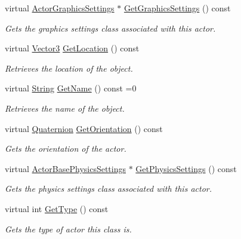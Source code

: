\begin{DoxyCompactItemize}
virtual \hyperlink{classMezzanine_1_1ActorGraphicsSettings}{ActorGraphicsSettings} $\ast$ \hyperlink{classMezzanine_1_1ActorBase_ae57a1a39b5f9483c949f6e3651aa163f}{GetGraphicsSettings} () const 
\begin{DoxyCompactList}\small\item\em Gets the graphics settings class associated with this actor. \item\end{DoxyCompactList}\item 
virtual \hyperlink{classMezzanine_1_1Vector3}{Vector3} \hyperlink{classMezzanine_1_1ActorBase_ab1706a379bf86d020e64e4b560cdeb73}{GetLocation} () const 
\begin{DoxyCompactList}\small\item\em Retrieves the location of the object. \item\end{DoxyCompactList}\item 
virtual \hyperlink{namespaceMezzanine_acf9fcc130e6ebf08e3d8491aebcf1c86}{String} \hyperlink{classMezzanine_1_1ActorBase_a01e16da200911fdff659bfb78bafff1d}{GetName} () const =0
\begin{DoxyCompactList}\small\item\em Retrieves the name of the object. \item\end{DoxyCompactList}\item 
virtual \hyperlink{classMezzanine_1_1Quaternion}{Quaternion} \hyperlink{classMezzanine_1_1ActorBase_ac04f313c7e1272c519d0284bc98148a4}{GetOrientation} () const 
\begin{DoxyCompactList}\small\item\em Gets the orientation of the actor. \item\end{DoxyCompactList}\item 
virtual \hyperlink{classMezzanine_1_1ActorBasePhysicsSettings}{ActorBasePhysicsSettings} $\ast$ \hyperlink{classMezzanine_1_1ActorBase_a08c975572f1ab5cde651e1a6e5d9bb6a}{GetPhysicsSettings} () const 
\begin{DoxyCompactList}\small\item\em Gets the physics settings class associated with this actor. \item\end{DoxyCompactList}\item 
virtual int \hyperlink{classMezzanine_1_1ActorBase_ac9a208af008d628e6442079c2ec80fa9}{GetType} () const 
\begin{DoxyCompactList}\small\item\em Gets the type of actor this class is. \item\end{DoxyCompactList}\item 

\end{DoxyCompactItemize}
